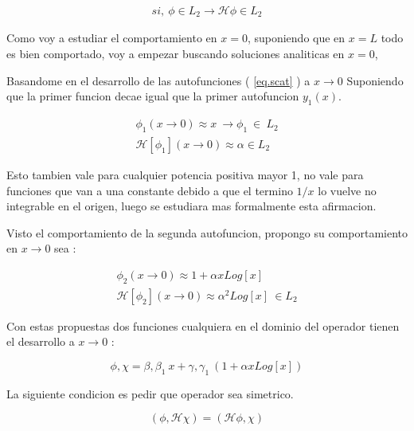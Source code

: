 \begin{equation}
\begin{array}{c}
si, \ \phi \in L _2 \rightarrow \mathscr{H} \phi \in L _2
\end{array}
\end{equation}


Como voy a estudiar el comportamiento en $x=0$, suponiendo que en $x=L$ todo es bien comportado, voy a empezar buscando soluciones analiticas en $x=0$, 

Basandome en el desarrollo de las autofunciones ( \ref{eq.scat} ) a  $x \rightarrow 0 $ 
Suponiendo que la primer funcion decae igual que la primer autofuncion $ y_1 (x) $.

\begin{equation}
\begin{array}{c}
\phi _1 (x \rightarrow 0) \approx x \ \rightarrow \phi _1 \ \in \ L _2 \\
\mathscr{H} [ \phi _1 ] (x \rightarrow 0) \approx \alpha \in L _2
\end{array}
\label{eq.chico1}
\end{equation}

Esto tambien vale para cualquier potencia positiva mayor 1, no vale para funciones que van a una constante debido a que el termino $1/x$ lo vuelve no integrable en el origen, luego se estudiara mas formalmente esta afirmacion.

Visto el comportamiento de la segunda autofuncion, propongo su comportamiento en $x \rightarrow 0 $ sea :

\begin{equation}
\begin{array}{c}
\phi _2 (x \rightarrow 0) \approx 1 + \alpha x Log[x] \\
\mathscr{H} [\phi _2] (x \rightarrow 0 ) \approx \alpha ^2 Log[x] \ \in L _2
\end{array}
\label{eq.chico2}
\end{equation}

Con estas propuestas dos funciones cualquiera en el dominio del operador tienen el desarrollo a $x \rightarrow 0$ :

\begin{equation}
\phi , \chi = \beta , \beta _1 \ x + \gamma , \gamma _1 \ (1+ \alpha x Log[x] )
\label{eq.phi.chi}
\end{equation}

La siguiente condicion es pedir que operador sea simetrico.

\begin{equation}
(\phi, \mathscr{H} \chi ) = ( \mathscr{H} \phi , \chi )
\end{equation}

